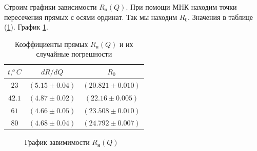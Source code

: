 \documentclass[a4paper, 12pt]{article}
\begin{document}
            Строим графики зависимости $R_н(Q)$. При помощи МНК находим точки пересечения прямых с осями ординат. Так мы находим $R_0$. Значения в таблице (\ref{RQ_coeffs}). График \ref{RQ_graph}.

            \begin{table}[!ht]
                \centering
                \begin{tabular}{|c|c|c|}
                    \hline

                    $t, ^oC$ & $dR/dQ$ & $R_0$\\ \hline
                    $23$ & $(5.15 \pm 0.04)$ & $(20.821 \pm 0.010)$\\ \hline
                    $42.1$ & $(4.87 \pm 0.02)$ & $(22.16 \pm 0.005)$\\ \hline
                    $61$ & $(4.66 \pm 0.05)$ & $(23.508 \pm 0.010)$\\ \hline
                    $80$ & $(4.68 \pm 0.04)$ & $(24.792 \pm 0.007)$\\ \hline

                \end{tabular}
                \caption{Коэффициенты прямых $R_н(Q)$ и их случайные погрешности}
                \label{RQ_coeffs}
            \end{table}

            \begin{figure}[ht]
                \caption{График завимимости $R_н(Q)$}
                \label{RQ_graph}
            \end{figure}
\end{document}
